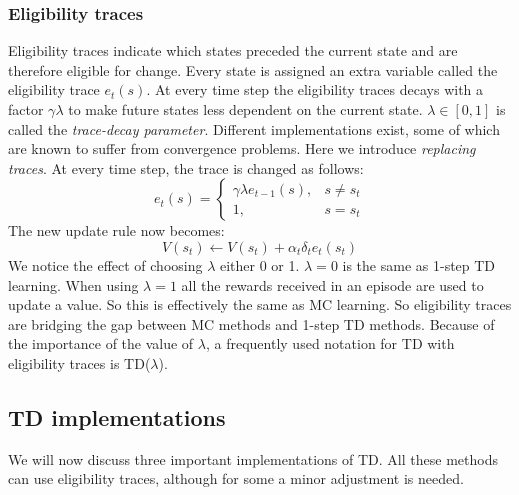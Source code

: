 \documentclass[a4paper,11pt]{mscLiterature}
\begin{document}
		\subsubsection{Eligibility traces}
				Eligibility traces indicate which states preceded the current state and are therefore eligible for change. Every state is assigned an extra variable called the eligibility trace $e_t(s)$. At every time step the eligibility traces decays with a factor $\gamma\lambda$ to make future states less dependent on the current state. $\lambda \in [0,1]$ is called the \emph{trace-decay parameter}. Different implementations exist, some of which are known to suffer from convergence problems. Here we introduce \emph{replacing traces}. At every time step, the trace is changed as follows:
				\begin{equation}
				e_t(s) = \left\{ \begin{array}{cc} \gamma\lambda e_{t-1}(s), & s\neq s_t \\ 1, & s=s_t \end{array} \right.
				\end{equation}
				The new update rule now becomes:
				\begin{equation}\label{eqn:TDeligibilityTraces}
					V(s_t) \leftarrow V(s_t) + \alpha_t \delta_t e_t(s_t)
				\end{equation}
				We notice the effect of choosing $\lambda$ either 0 or 1. $\lambda=0$ is the same as 1-step TD learning. When using $\lambda=1$ all the rewards received in an episode are used to update a value. So this is effectively the same as MC learning. So eligibility traces are bridging the gap between MC methods and 1-step TD methods. Because of the importance of the value of $\lambda$, a frequently used notation for TD with eligibility traces is TD($\lambda$).
		
	\subsection{TD implementations}		
	We will now discuss three important implementations of TD. All these methods can use eligibility traces, although for some a minor adjustment is needed.
	
\end{document}
